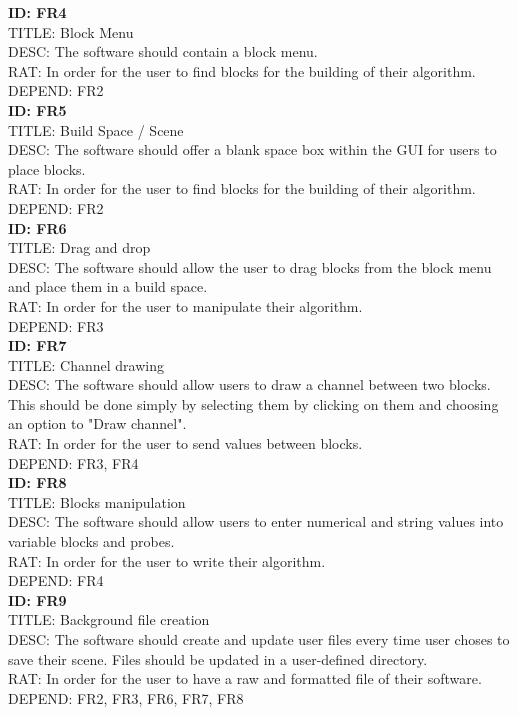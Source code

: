 \documentclass[journal,10pt,onecolumn,compsoc]{IEEEtran} \usepackage[margin=1.0in]{geometry} \usepackage{pdfpages} \usepackage{graphicx}
\begin{document}
\noindent
\textbf{ID: FR4}\\
TITLE: Block Menu\\
DESC: The software should contain a block menu.\\
RAT: In order for the user to find blocks for the building of their algorithm.\\
DEPEND: FR2\\

\noindent
\textbf{ID: FR5}\\
TITLE: Build Space / Scene\\
DESC: The software should offer a blank space box within the GUI for users to place blocks.\\
RAT: In order for the user to find blocks for the building of their algorithm.\\
DEPEND: FR2\\

\noindent
\textbf{ID: FR6}\\
TITLE: Drag and drop\\
DESC: The software should allow the user to drag blocks from the block menu and place them in a build space.\\
RAT: In order for the user to manipulate their algorithm.\\
DEPEND: FR3\\

\noindent
\textbf{ID: FR7}\\
TITLE: Channel drawing\\
DESC: The software should allow users to draw a channel between two blocks. 
This should be done simply by selecting them by clicking on them and choosing an option to "Draw channel".\\
RAT: In order for the user to send values between blocks.\\
DEPEND: FR3, FR4\\

\noindent
\textbf{ID: FR8}\\
TITLE: Blocks manipulation\\
DESC: The software should allow users to enter numerical and string values into variable blocks and probes.\\
RAT: In order for the user to write their algorithm.\\
DEPEND: FR4\\

\noindent
\textbf{ID: FR9}\\
TITLE: Background file creation\\
DESC: The software should create and update user files every time user choses to save their scene. 
Files should be updated in a user-defined directory.\\
RAT: In order for the user to have a raw and formatted file of their software.\\
DEPEND: FR2, FR3, FR6, FR7, FR8\\
\end{document}
